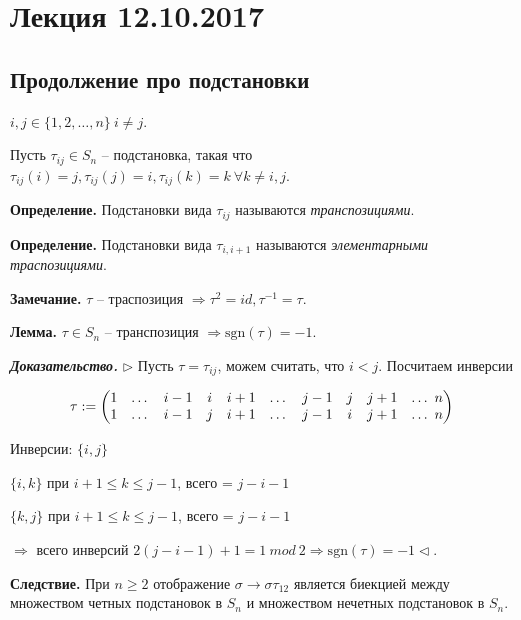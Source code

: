 \section{Лекция 12.10.2017}

\subsection{Продолжение про подстановки}

$i, j \in \{1, 2, \dots, n\} \ i \neq j$.

\vspace{\baselineskip}
Пусть $\tau_{ij} \in S_n$ -- подстановка, такая что $\tau_{ij}(i) = j, \tau_{ij}(j) = i, \tau_{ij}(k) = k \ \forall k \neq i,j$.

\vspace{\baselineskip}
\textbf{Определение.} Подстановки вида $\tau_{ij}$ называются \textit{транспозициями}.

\vspace{\baselineskip}
\textbf{Определение.} Подстановки вида $\tau_{i, i+1}$ называются \textit{элементарными траспозициями}.

\vspace{\baselineskip}
\textbf{Замечание.} $\tau$ -- траспозиция $\Rightarrow \tau^2 = id, \tau^{-1} = \tau$.

\vspace{\baselineskip}
\textbf{Лемма.} $\tau \in S_n$ -- транспозиция $\Rightarrow \mathrm{sgn}(\tau) = -1$.

\vspace{\baselineskip}
\textbf{\textit{Доказательство.}} $\rhd$ Пусть $\tau = \tau_{ij}$, можем считать, что $i < j$. Посчитаем инверсии

\[\tau := \begin{pmatrix} 
	1 & \dots & i-1 & i & i + 1 & \dots & 
	j - 1 & j & j + 1 & \dots \ n
	\cr 
	1 & \dots & i-1 & j & i + 1 & \dots & 
	j - 1 & i & j + 1 & \dots \ n
\end{pmatrix}\]

Инверсии: $\{i, j\}$

$\{i, k\}$ при $i + 1 \leq k \leq j -1$, всего =  $j-i-1$

$\{k, j\}$ при $i + 1 \leq k \leq j -1$, всего =  $j-i-1$

$\Rightarrow$ всего инверсий $2(j-i-1) + 1 = 1 \ mod \ 2 \Rightarrow \mathrm{sgn}(\tau) = -1 \lhd$.

\vspace{\baselineskip}
\textbf{Следствие.} При $n \geq 2$ отображение $\sigma \rightarrow \sigma \tau_{12}$ является биекцией между множеством четных подстановок в $S_n$ и множеством нечетных подстановок в $S_n$.

